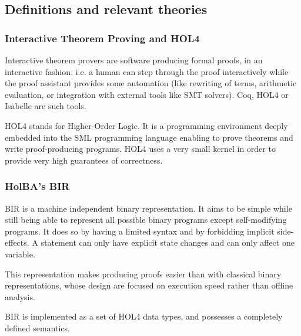 \documentclass[10pt,a4paper]{article}
\begin{document}
\begin{multicols}{2}


\subsection{Definitions and relevant theories}

\subsubsection{Interactive Theorem Proving and HOL4} \label{hol4-presentation}

Interactive theorem provers are software producing formal proofs, in an
interactive fashion, i.e. a human can step through the proof interactively while the proof assistant provides some automation (like rewriting of terms, arithmetic evaluation, or integration with external tools like SMT solvers). Coq, HOL4 or Isabelle are such tools.

HOL4 stands for Higher-Order Logic. It is a programming environment deeply embedded into the {SML} programming language enabling to prove theorems and write {proof-producing} programs. HOL4 uses a very small kernel in order to provide very high guarantees of correctness.

\subsubsection{HolBA's BIR} \label{bir-presentation}

BIR is a machine independent binary representation. It aims to be simple while still being able to represent all possible binary programs except self-modifying programs. It does so by having a limited syntax and by forbidding implicit side-effects. A statement can only have explicit state changes and can only affect one variable.

This representation makes producing proofs easier than with classical binary representations, whose design are focused on execution speed rather than offline analysis.

BIR is implemented as a set of HOL4 data types, and possesses a completely defined semantics.


\end{multicols}
\end{document}
